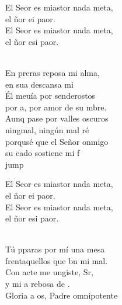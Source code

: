 \begin{cancion}%
	\begin{chorus}%
	El Seor es miastor nada meta,\\
	el ñor ei paor.\\
	El Seor es miastor nada meta,\\
	el ñor esi paor.\\
	\end{chorus}%
	\jump\\
	En preras reposa mi alma,\\
	en sua descansa mi \\
	Él meuía por senderostos\\
	por a, por amor de su mbre.\\
	Aunq pase por valles oscuros\\
	ningmal, ningún mal ré\\
	porqusé que el Señor onmigo\\
	su cado sostiene mi f\\jump\\
	\begin{chorus}%
	El Seor es miastor nada meta,\\
	el ñor ei paor.\\
	El Seor es miastor nada meta,\\
	el ñor esi paor.\\
	\end{chorus}%
	\jump\\
	Tú pparas por mí una mesa\\
	frentaquellos que bn mi mal.\\
	Con acte me ungiste, Sr,\\
	y mi a rebosa de .\\
	Gloria a os, Padre omnipotente\\

\end{cancion}
